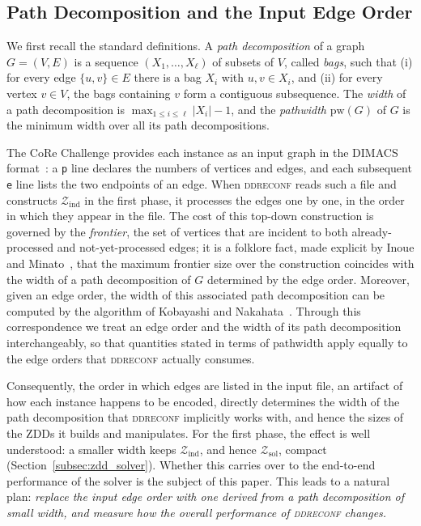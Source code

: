 \documentclass[conference]{IEEEtran}
\newcommand{\zind}{\mathcal{Z}_{\mathrm{ind}}}
\newcommand{\zsol}{\mathcal{Z}_{\mathrm{sol}}}
\begin{document}
\subsection{Path Decomposition and the Input Edge Order}
\label{subsec:pathdecomp}

We first recall the standard definitions.
A \emph{path decomposition} of a graph $G = (V, E)$ is a sequence
$(X_1, \dots, X_\ell)$ of subsets of $V$, called \emph{bags}, such that
(i) for every edge $\{u, v\} \in E$ there is a bag $X_i$ with $u, v \in X_i$, and
(ii) for every vertex $v \in V$, the bags containing $v$ form a contiguous
subsequence. The \emph{width} of a path decomposition is
$\max_{1 \le i \le \ell} |X_i| - 1$, and the \emph{pathwidth} $\mathrm{pw}(G)$ of
$G$ is the minimum width over all its path decompositions.

The CoRe Challenge provides each instance as an input graph in the DIMACS
format~\cite{sotaokit24}: a \texttt{p} line declares the numbers of vertices and
edges, and each subsequent \texttt{e} line lists the two endpoints of an edge.
When \textsc{ddreconf} reads such a file and constructs $\zind$ in the first
phase, it processes the edges one by one, in the order in which they appear in
the file. The cost of this top-down construction is governed by the
\emph{frontier}, the set of vertices that are incident to both already-processed
and not-yet-processed edges; it is a folklore fact, made explicit by Inoue and
Minato~\cite{inoue16}, that the maximum frontier size over the construction
coincides with the width of a path decomposition of $G$ determined by the edge
order. Moreover, given an edge order, the width of this associated path
decomposition can be computed by the algorithm of Kobayashi and
Nakahata~\cite[Lemma~2]{KobayashiNakahata2020}. Through this correspondence we
treat an edge order and the width of its path decomposition interchangeably, so
that quantities stated in terms of pathwidth apply equally to the edge orders
that \textsc{ddreconf} actually consumes.

Consequently, the order in which edges are listed in the input file, an artifact
of how each instance happens to be encoded, directly determines the width of the
path decomposition that \textsc{ddreconf} implicitly works with, and hence the
sizes of the ZDDs it builds and manipulates. For the first phase, the effect is
well understood: a smaller width keeps $\zind$, and hence $\zsol$, compact
(Section~\ref{subsec:zdd_solver}). Whether this carries over to the end-to-end
performance of the solver is the subject of this paper. This leads to a natural
plan: \emph{replace the input edge order with one derived from a path
decomposition of small width, and measure how the overall performance of
\textsc{ddreconf} changes.}
\end{document}
